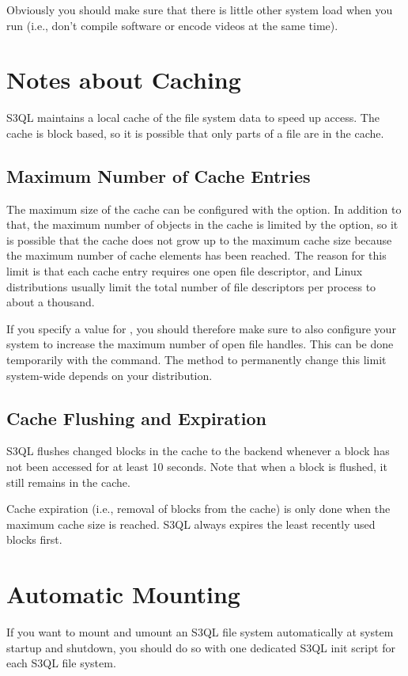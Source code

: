 \documentclass[letterpaper,10pt,english]{sphinxmanual}
\begin{document}
Obviously you should make sure that there is little other system load
when you run  (i.e., don't compile software or encode
videos at the same time).


\section{Notes about Caching}
\label{mount:notes-about-caching}
S3QL maintains a local cache of the file system data to speed up
access. The cache is block based, so it is possible that only parts of
a file are in the cache.


\subsection{Maximum Number of Cache Entries}
\label{mount:maximum-number-of-cache-entries}
The maximum size of the cache can be configured with the 
option. In addition to that, the maximum number of objects in the
cache is limited by the  option, so it is
possible that the cache does not grow up to the maximum cache size
because the maximum number of cache elements has been reached. The
reason for this limit is that each cache entry requires one open
file descriptor, and Linux distributions usually limit the total
number of file descriptors per process to about a thousand.

If you specify a value for , you should therefore
make sure to also configure your system to increase the maximum number
of open file handles. This can be done temporarily with the 
command. The method to permanently change this limit system-wide
depends on your distribution.


\subsection{Cache Flushing and Expiration}
\label{mount:cache-flushing-and-expiration}
S3QL flushes changed blocks in the cache to the backend whenever a block
has not been accessed for at least 10 seconds. Note that when a block is
flushed, it still remains in the cache.

Cache expiration (i.e., removal of blocks from the cache) is only done
when the maximum cache size is reached. S3QL always expires the least
recently used blocks first.


\section{Automatic Mounting}
\label{mount:automatic-mounting}
If you want to mount and umount an S3QL file system automatically at
system startup and shutdown, you should do so with one dedicated S3QL
init script for each S3QL file system.
\end{document}
